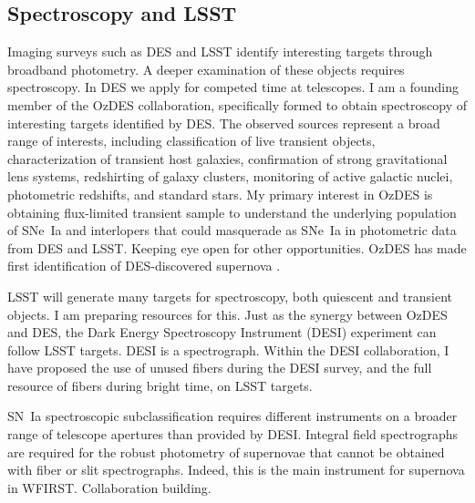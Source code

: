 \documentclass{article}
\begin{document}
\subsection{Spectroscopy and LSST}
Imaging surveys such as DES and LSST identify interesting targets through broadband photometry.
A deeper examination of these objects requires spectroscopy. In DES we apply for competed time at
telescopes.  I am a founding member of the OzDES collaboration, specifically formed to obtain spectroscopy
of interesting targets identified by DES.  The observed sources represent a broad range of interests,
including classification of live transient objects, characterization of transient host galaxies, confirmation
of strong gravitational lens systems, redshirting of galaxy clusters, monitoring of active galactic nuclei, photometric redshifts,
and
standard stars.  My primary interest in OzDES is obtaining flux-limited transient sample to understand the
underlying population of SNe~Ia  \cite{2006MNRAS.370..933J} and interlopers that could masquerade as SNe~Ia in photometric
data from DES and LSST.  Keeping eye open for other opportunities.
OzDES has made first identification of DES-discovered supernova \cite{2013ATel.5568....1C}.

LSST will generate many targets for spectroscopy, both quiescent and transient objects.  I am preparing
resources for this.  Just as the synergy between OzDES and DES, the Dark Energy Spectroscopy Instrument
(DESI) experiment can follow LSST
targets.  DESI is a spectrograph.   Within the DESI collaboration, I have proposed the use of unused fibers during the
DESI survey, and the full resource of fibers during bright time, on LSST targets.

SN~Ia spectroscopic subclassification requires different instruments on a broader range of
telescope apertures than provided by DESI.  Integral field spectrographs are required for
the robust photometry of supernovae that cannot be obtained with fiber or slit spectrographs.  
Indeed, this is the main instrument for supernova in WFIRST.  
Collaboration building.
\end{document}

